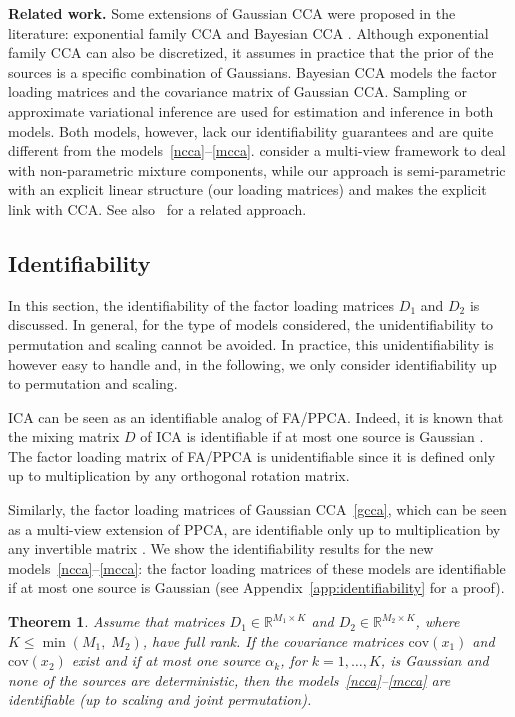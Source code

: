 \documentclass{article}
\newcommand{\ppp}{\textbf}
\newtheorem{theorem}{Theorem}
\newcommand{\R}{\mathbb{R}}
\newcommand{\cov}{\mathrm{cov}}
\begin{document}
 
\ppp{Related work.}
Some extensions of Gaussian CCA were proposed in the literature: exponential family CCA \citep{Vir2010,KlaEtAl2010} and Bayesian CCA \citep[see, e.g.,][and references therein]{KlaEtAl2013}. 
Although exponential family CCA can also be discretized, it assumes in practice that the prior of the sources is a specific combination of Gaussians.
Bayesian CCA models the factor loading matrices and the covariance matrix of Gaussian CCA.
Sampling or approximate variational inference are used for estimation and inference in both models. Both models, however, lack our identifiability guarantees and are quite different from the models~\eqref{ncca}--\eqref{mcca}.
\citet{SonEtAl2014} consider a multi-view framework to deal with non-parametric mixture components, while our approach is semi-parametric with an explicit linear structure (our loading matrices) and makes the explicit link with CCA. See also~\citet{GeZou2016} for a related approach.



\subsection{Identifiability}
\label{sec:identifiability}
In this section, the identifiability of the factor loading matrices $D_1$ and $D_2$ is discussed. In general, for the type of models considered, the unidentifiability to permutation and scaling cannot be avoided. In practice, this unidentifiability is however easy to handle
and, in the following, we only consider identifiability up to permutation and scaling.

ICA can be seen as an identifiable analog of FA/PPCA.
Indeed, it is known that the mixing matrix $D$ of ICA is identifiable if at most one source is Gaussian \citep{Com1994}. The factor loading matrix of FA/PPCA is unidentifiable since it is defined only up to
multiplication by any orthogonal rotation matrix.


Similarly, the factor loading matrices of Gaussian CCA~\eqref{gcca}, which can be seen as a multi-view extension of PPCA, are identifiable only up to multiplication by any invertible matrix \citep{BacJor2005}. We show the identifiability results for the new models~\eqref{ncca}--\eqref{mcca}: the factor loading matrices of these models are identifiable if at most one source is Gaussian (see Appendix~\ref{app:identifiability} for a proof).

\vspace{0em}
\begin{theorem}
Assume that matrices $D_1\in\R^{M_1\times K}$ and $D_2\in\R^{M_2\times K}$, where $K \le \min(M_1,\;M_2)$, have full rank. If the covariance matrices $\cov(x_1)$ and $\cov(x_2)$ exist and if at most one source $\alpha_k$, for $k=1,\dots,K$, is Gaussian and none of the sources are deterministic, then the models~\eqref{ncca}--\eqref{mcca} are identifiable (up to scaling and joint permutation).
\label{thm:identif}
\vspace{-1.5em}
\end{theorem}
\end{document}
